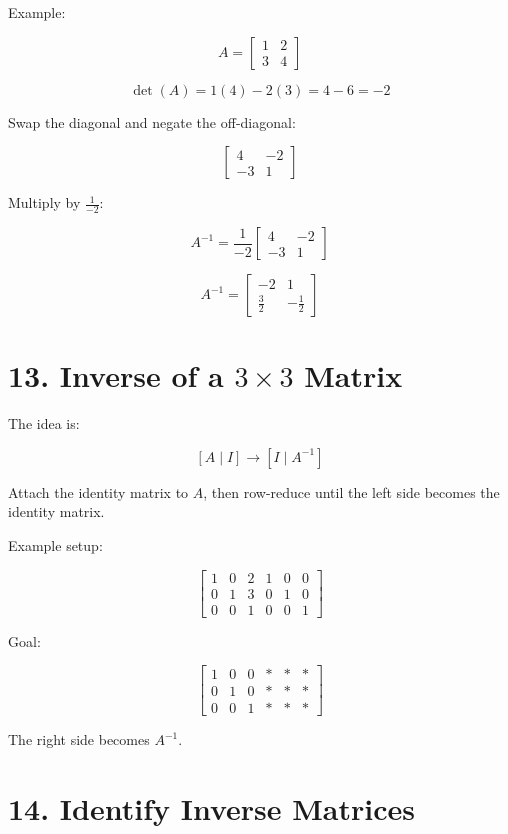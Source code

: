 \documentclass[11pt]{article}
\begin{document}
Example:

\[
A=
\begin{bmatrix}
1 & 2\\
3 & 4
\end{bmatrix}
\]

\[
\det(A)=1(4)-2(3)=4-6=-2
\]

Swap the diagonal and negate the off-diagonal:

\[
\begin{bmatrix}
4 & -2\\
-3 & 1
\end{bmatrix}
\]

Multiply by \(\frac{1}{-2}\):

\[
A^{-1}
=
\frac{1}{-2}
\begin{bmatrix}
4 & -2\\
-3 & 1
\end{bmatrix}
\]

\[
A^{-1}
=
\begin{bmatrix}
-2 & 1\\
\frac{3}{2} & -\frac{1}{2}
\end{bmatrix}
\]

\section*{13. Inverse of a \(3\times3\) Matrix}

The idea is:

\[
[A\mid I]\rightarrow[I\mid A^{-1}]
\]

Attach the identity matrix to \(A\), then row-reduce until the left side becomes the identity matrix.

Example setup:

\[
\left[
\begin{array}{ccc|ccc}
1 & 0 & 2 & 1 & 0 & 0\\
0 & 1 & 3 & 0 & 1 & 0\\
0 & 0 & 1 & 0 & 0 & 1
\end{array}
\right]
\]

Goal:

\[
\left[
\begin{array}{ccc|ccc}
1 & 0 & 0 & * & * & *\\
0 & 1 & 0 & * & * & *\\
0 & 0 & 1 & * & * & *
\end{array}
\right]
\]

The right side becomes \(A^{-1}\).

\section*{14. Identify Inverse Matrices}
\end{document}
